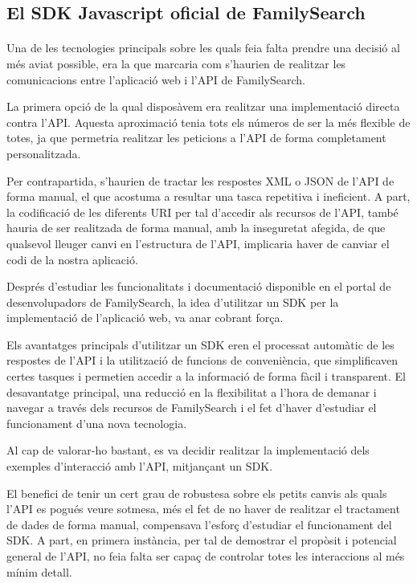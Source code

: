 \subsection{El SDK Javascript oficial de FamilySearch}

    \paragraph{}
    Una de les tecnologies principals sobre les quals feia falta prendre una decisió al més aviat possible, era la que marcaria com s'haurien de realitzar les comunicacions entre l’aplicació web i l’API de FamilySearch.

    La primera opció de la qual disposàvem era realitzar una implementació directa contra l’API. Aquesta aproximació tenia tots els números de ser la més flexible de totes, ja que permetria realitzar les peticions a l’API de forma completament personalitzada.

    Per contrapartida, s'haurien de tractar les respostes XML o JSON de l’API de forma manual, el que acostuma a resultar una tasca repetitiva i ineficient. A part, la codificació de les diferents URI per tal d’accedir als recursos de l’API, també hauria de ser realitzada de forma manual, amb la inseguretat afegida, de que qualsevol lleuger canvi en l’estructura de l’API, implicaria haver de canviar el codi de la nostra aplicació.

    Després d'estudiar les funcionalitats i documentació disponible en el portal de desenvolupadors de FamilySearch, la idea d'utilitzar un SDK per la implementació de l’aplicació web, va anar cobrant força.

    Els avantatges principals d’utilitzar un SDK eren el processat automàtic de les respostes de l’API i la utilització de funcions de conveniència, que simplificaven certes tasques i permetien accedir a la informació de forma fàcil i transparent. El desavantatge principal, una reducció en la flexibilitat a l'hora de demanar i navegar a través dels recursos de FamilySearch i el fet d’haver d'estudiar el funcionament d’una nova tecnologia.

    Al cap de valorar-ho bastant, es va decidir realitzar la implementació dels exemples d'interacció amb l’API, mitjançant un SDK.

    El benefici de tenir un cert grau de robustesa sobre els petits canvis als quals l’API es pogués veure sotmesa, més el fet de no haver de realitzar el tractament de dades de forma manual, compensava l'esforç d'estudiar el funcionament del SDK. A part, en primera instància, per tal de demostrar el propòsit i potencial general de l’API, no feia falta ser capaç de controlar totes les interaccions al més mínim detall.

